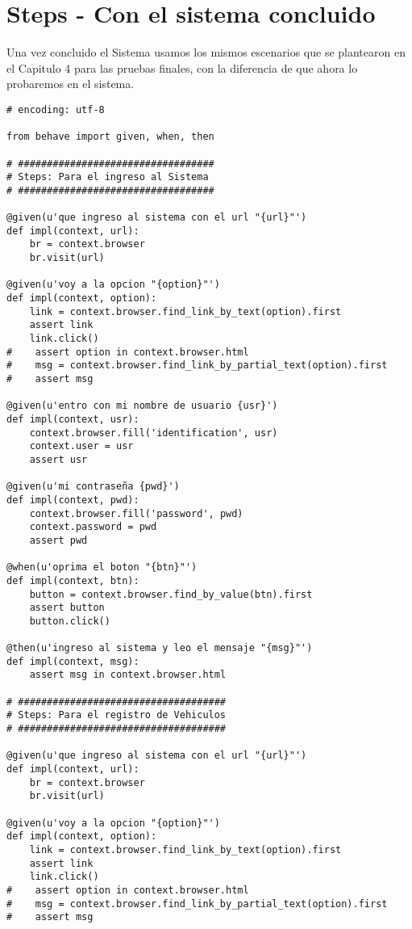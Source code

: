 \section{Steps - Con el sistema concluido}
Una vez concluido el Sistema usamos los mismos escenarios que se plantearon en
el Capitulo 4 para las pruebas finales, con la diferencia de que ahora lo probaremos
en el sistema.

{\scriptsize
  \begin{verbatim}
# encoding: utf-8

from behave import given, when, then

# ##################################
# Steps: Para el ingreso al Sistema
# ##################################

@given(u'que ingreso al sistema con el url "{url}"')
def impl(context, url):
    br = context.browser
    br.visit(url)

@given(u'voy a la opcion "{option}"')
def impl(context, option):
    link = context.browser.find_link_by_text(option).first
    assert link
    link.click()
#    assert option in context.browser.html
#    msg = context.browser.find_link_by_partial_text(option).first
#    assert msg

@given(u'entro con mi nombre de usuario {usr}')
def impl(context, usr):
    context.browser.fill('identification', usr)
    context.user = usr
    assert usr

@given(u'mi contraseña {pwd}')
def impl(context, pwd):
    context.browser.fill('password', pwd)
    context.password = pwd
    assert pwd

@when(u'oprima el boton "{btn}"')
def impl(context, btn):
    button = context.browser.find_by_value(btn).first
    assert button
    button.click()

@then(u'ingreso al sistema y leo el mensaje "{msg}"')
def impl(context, msg):
    assert msg in context.browser.html

# ####################################
# Steps: Para el registro de Vehiculos
# ####################################

@given(u'que ingreso al sistema con el url "{url}"')
def impl(context, url):
    br = context.browser
    br.visit(url)

@given(u'voy a la opcion "{option}"')
def impl(context, option):
    link = context.browser.find_link_by_text(option).first
    assert link
    link.click()
#    assert option in context.browser.html
#    msg = context.browser.find_link_by_partial_text(option).first
#    assert msg


\end{verbatim}}
